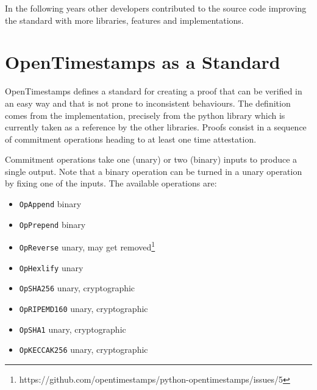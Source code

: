 In the following years other developers contributed to the source code improving the standard with more libraries, features and implementations. 

\section{OpenTimestamps as a Standard}
OpenTimestamps defines a standard for creating a proof that can be verified in an easy way and that is not prone to inconsistent behaviours. The definition comes from the implementation, precisely from the python library which is currently taken as a reference by the other libraries.
Proofs consist in a sequence of commitment operations heading to at least one time attestation. 

Commitment operations take one (unary) or two (binary) inputs to produce a single output. Note that a binary operation can be turned in a unary operation by fixing one of the inputs. The available operations are:
\begin{itemize}
	\item
	\verb|OpAppend| binary
	\item \verb|OpPrepend| binary
	\item \verb|OpReverse| unary, may get removed\footnote{https://github.com/opentimestamps/python-opentimestamps/issues/5}
	\item \verb|OpHexlify| unary
	\item \verb|OpSHA256| unary, cryptographic
	\item \verb|OpRIPEMD160| unary, cryptographic
	\item \verb|OpSHA1| unary, cryptographic
	\item \verb|OpKECCAK256| unary, cryptographic
\end{itemize}

